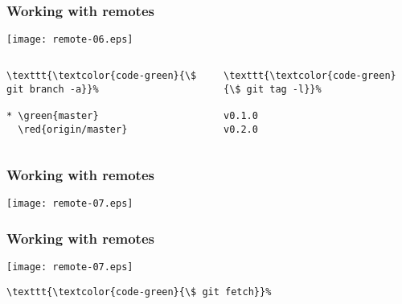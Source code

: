 \documentclass[english]{beamer}
\newcommand{\CMD}[1]{%
\texttt{\textcolor{code-green}{#1}}%
}
\newcommand{\green}[1]{%
\textcolor{code-green}{#1}%
}
\newcommand{\red}[1]{%
\textcolor{code-red}{#1}%
}
\begin{document}
\begin{frame}[fragile]
\frametitle{Working with remotes}

\texttt{[image: remote-06.eps]}

\begin{columns}[t]
        \begin{column}[T]{.5\textwidth}
{\tiny
\begin{Verbatim}[commandchars=\\\{\}]
\CMD{\$ git branch -a}
* \green{master}
  \red{origin/master}
\end{Verbatim}
}

        \end{column}
        \begin{column}[T]{.5\textwidth}
\pause{}
{\tiny
\begin{Verbatim}[commandchars=\\\{\}]
\CMD{\$ git tag -l}
v0.1.0
v0.2.0
\end{Verbatim}
}
        \end{column}
\end{columns}

\vspace{\textheight}
\end{frame}

\begin{frame}[fragile]
\frametitle{Working with remotes}

\texttt{[image: remote-07.eps]}

\vspace{\textheight}
\end{frame}

\begin{frame}[fragile]
\frametitle{Working with remotes}

\texttt{[image: remote-07.eps]}

\begin{Verbatim}[commandchars=\\\{\}]
\CMD{\$ git fetch}
\end{Verbatim}
\vspace{\textheight}
\end{frame}
\end{document}

